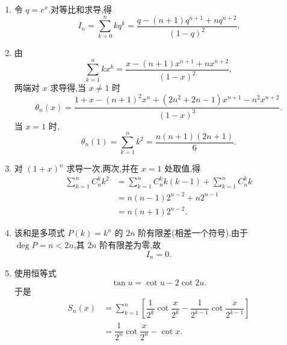 \begin{solution}
    \leavevmode
    \begin{enumerate}
        \item 令 $q=e^x$.对等比和求导,得
              \[
                  I_n=\sum\limits_{k=0}^{n}kq^k
                  =\dfrac{q-(n+1)q^{n+1}+nq^{n+2}}{(1-q)^2}.
              \]
        \item 由
              \[
                  \displaystyle\sum\limits_{k=1}^{n}kx^k
                  =\dfrac{x-(n+1)x^{n+1}+nx^{n+2}}{(1-x)^2},
              \]
              两端对 $x$ 求导得,当 $x\neq1$ 时
              \[
                  \theta_n(x)=
                  \dfrac{1+x-(n+1)^2x^n+(2n^2+2n-1)x^{n+1}-n^2x^{n+2}}
                  {(1-x)^3}.
              \]
              当 $x=1$ 时,
              \[
                  \theta_n(1)=\sum\limits_{k=1}^{n}k^2
                  =\dfrac{n(n+1)(2n+1)}{6}.
              \]
        \item 对 $(1+x)^n$ 求导一次,两次,并在 $x=1$ 处取值,得
              \[
                  \begin{aligned}
                      \sum\limits_{k=1}^{n}C_n^k k^2
                       & =\sum\limits_{k=1}^{n}C_n^k k(k-1)
                      +\sum\limits_{k=1}^{n}C_n^k k         \\
                       & =n(n-1)2^{n-2}+n2^{n-1}            \\
                       & =n(n+1)2^{n-2}.
                  \end{aligned}
              \]
        \item 该和是多项式 $P(k)=k^n$ 的 $2n$ 阶有限差(相差一个符号).由于 $\deg P=n<2n$,其 $2n$ 阶有限差为零,故
              \[
                  I_n=0.
              \]
        \item 使用恒等式
              \[
                  \tan u=\cot u-2\cot2u.
              \]
              于是
              \[
                  \begin{aligned}
                      S_n(x)
                       & =\sum\limits_{k=1}^{n}\left[
                          \dfrac{1}{2^k}\cot\dfrac{x}{2^k}
                          -\dfrac{1}{2^{k-1}}\cot\dfrac{x}{2^{k-1}}
                      \right]                                      \\
                       & =\dfrac{1}{2^n}\cot\dfrac{x}{2^n}-\cot x.
                  \end{aligned}
              \]
    \end{enumerate}
\end{solution}

